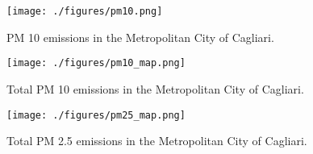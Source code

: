 \documentclass[a4paper]{article}
\begin{document}
\begin{figure}[tbp]
    \centering
    \texttt{[image: ./figures/pm10.png]}
    \caption{PM 10 emissions in the Metropolitan City of Cagliari.}
    \label{fig:pm10-prov-casteddu}
\end{figure}

\begin{figure}[tbp]
    \centering
    \texttt{[image: ./figures/pm10\_map.png]}
    \caption{Total PM 10 emissions in the Metropolitan City of Cagliari.}
    \label{fig:pm10-prov-casteddu-map}
\end{figure}

\begin{figure}[tbp]
    \centering
    \texttt{[image: ./figures/pm25\_map.png]}
    \caption{Total PM 2.5 emissions in the Metropolitan City of Cagliari.}
    \label{fig:pm25-prov-casteddu-map}
\end{figure}

\printbibliography
\end{document}
